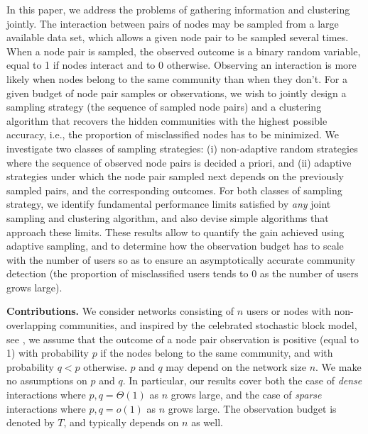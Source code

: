 \documentclass[12pt]{colt}%
\begin{document}
In this paper, we address the problems of gathering information and clustering jointly. The interaction between pairs of nodes may be sampled from a large available data set, which allows a given node pair to be sampled several times. When a node pair is sampled, the observed outcome is a binary random variable, equal to 1 if nodes interact and to 0 otherwise. Observing an interaction is more likely when nodes belong to the same community than when they don't. For a given budget of node pair samples or observations, we wish to jointly design a sampling strategy (the sequence of sampled node pairs) and a clustering algorithm that recovers the hidden communities with the highest possible accuracy, i.e., the proportion of misclassified nodes has to be minimized. We investigate two classes of sampling strategies: (i) non-adaptive random strategies where the sequence of observed node pairs is decided a priori, and (ii) adaptive strategies under which the node pair sampled next depends on the previously sampled pairs, and the corresponding outcomes. For both classes of sampling strategy, we identify fundamental performance limits satisfied by {\it any} joint sampling and clustering algorithm, and also devise simple algorithms that approach these limits. These results allow to quantify the gain achieved using adaptive sampling, and to determine how the observation budget has to scale with the number of users so as to ensure an asymptotically accurate community detection (the proportion of misclassified users tends to 0 as the number of users grows large).

\medskip
\noindent
{\bf Contributions.} We consider networks consisting of $n$ users or nodes with non-overlapping communities, and inspired by the celebrated stochastic block model, see \cite{holland1983}, we assume that the outcome of a node pair observation is positive (equal to 1) with probability $p$ if the nodes belong to the same community, and with probability $q<p$ otherwise. $p$ and $q$ may depend on the network size  $n$. We make no assumptions on $p$ and $q$. In particular, our results cover both the case of {\it dense} interactions where $p,q=\Theta(1)$ as $n$ grows large, and the case of {\it sparse} interactions where $p,q=o(1)$ as $n$ grows large. The observation budget is denoted by $T$, and typically depends on $n$ as well.
\end{document}

